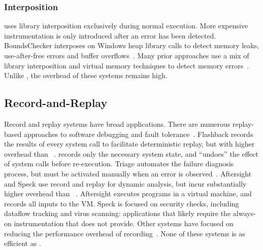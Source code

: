 \subsubsection*{Interposition}
\doubletake{} uses library interposition exclusively during normal execution. More expensive instrumentation is only introduced after an error has been detected. BoundsChecker interposes on Windows heap library calls to detect memory leaks, use-after-free errors and buffer overflows~\cite{BoundsChecker}. Many prior approaches use a mix of library interposition and virtual memory techniques to detect memory errors~\cite{duma, Sleigh, Undangle, SWAT, Dlmalloc, GuardMalloc, exterminator, Hound, electricfence, overflow:Cruiser}. Unlike \doubletake{}, the overhead of these systems remains high.
 
\subsection{Record-and-Replay}
Record and replay systems have broad applications. There are numerous replay-based approaches to software debugging and fault tolerance~\cite{Bressoud:1995:HFT:224056.224058, OSDebug, Rx, RecPlay, Flashback, Triage}. Flashback records the results of every system call to facilitate deterministic replay, but with higher overhead than \doubletake{}~\cite{Flashback}. \doubletake{} records only the necessary system state, and ``undoes'' the effect of system calls before re-execution. Triage automates the failure diagnosis process, but must be activated manually when an error is observed~\cite{Triage}. Aftersight and Speck use record and replay for dynamic analysis, but incur substantially higher overhead than \doubletake{}~\cite{Aftersight, Speck}. Aftersight executes programs in a virtual machine, and records all inputs to the VM. Speck is focused on security checks, including dataflow tracking and virus scanning: applications that likely require the always-on instrumentation that \doubletake{} does not provide. Other systems have focused on reducing the performance overhead of recording~\cite{ODR, Respec, PRES, DoublePlay}. None of these systems is as efficient as \doubletake{}.
